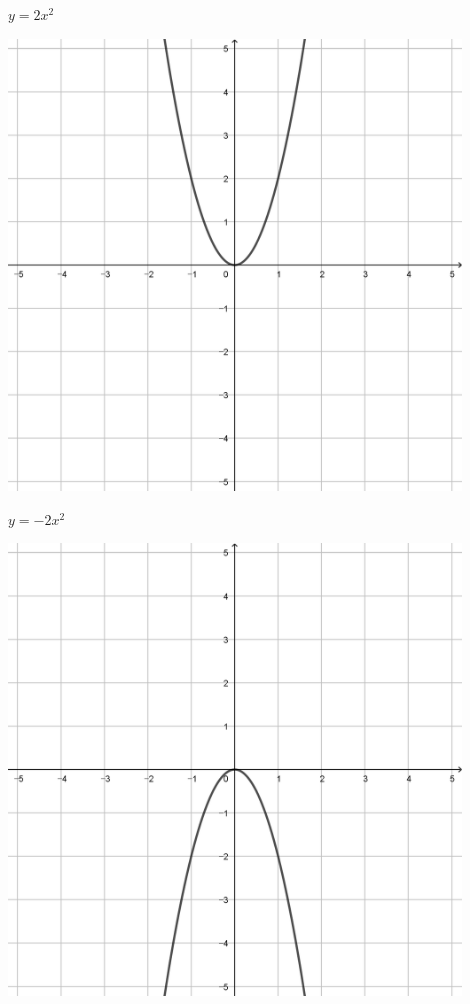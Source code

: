 \documentclass[a4paper]{oblivoir}
\begin{document}
\begin{minipage}{0.45\textwidth}\centering
\(y=2x^2\)
\par\bigskip\includegraphics[width=0.9\textwidth]{img/2_quadratic_3}
\end{minipage}
\begin{minipage}{0.45\textwidth}\centering
\(y=-2x^2\)
\par\bigskip\includegraphics[width=0.9\textwidth]{img/2_quadratic_4}
\end{minipage}\bigskip\bigskip\par
\end{document}
